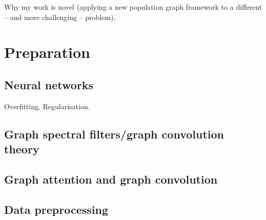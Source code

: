 \documentclass[12pt,a4paper,twoside, openright, hidelinks]{report}
\begin{document}
Why my work is novel (applying a new population graph framework to a different – and more challenging – problem).

\chapter{Preparation}

\section{Neural networks}
Overfitting. Regularisation.

\section{Graph spectral filters/graph convolution theory}

\section{Graph attention and graph convolution}

\section{Data preprocessing}
\end{document}
